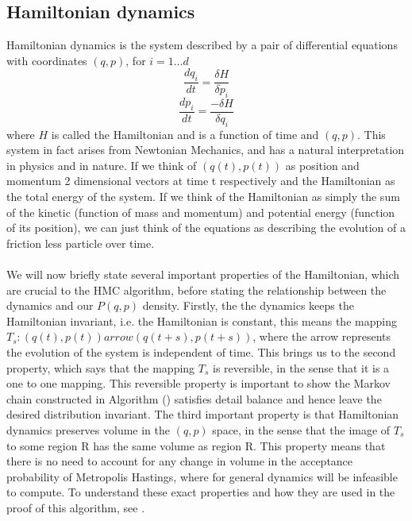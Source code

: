\documentclass[11pt]{article}
\begin{document}
\subsection{Hamiltonian dynamics}
Hamiltonian dynamics is the system described by a pair of differential equations with coordinates $(q,p)$, for $i=1 \dots d$
\begin{equation}
\frac{dq_{i}}{dt} = \frac{\delta H}{\delta p_{i}}
\end{equation}
\begin{equation}
\frac{dp_{i}}{dt} = \frac{-\delta H}{\delta q_{i}}
\end{equation}
where $H$ is called the Hamiltonian and is a function of time and $(q,p)$. This system in fact arises from Newtonian Mechanics, and has a natural interpretation in physics and in nature. If we think of $(q(t),p(t))$ as position and momentum 2 dimensional vectors at time t respectively and the Hamiltonian as the total energy of the system. If we think of the Hamiltonian as simply the sum of the kinetic (function of mass and momentum) and potential energy (function of its position), we can just think of the equations as describing the evolution of a friction less particle over time.\\ \\
We will now briefly state several important properties of the Hamiltonian, which are crucial to the HMC algorithm, before stating the relationship between the dynamics and our $P(q,p)$ density. Firstly, the the dynamics keeps the Hamiltonian invariant, i.e. the Hamiltonian is constant, this means the mapping $T_s: (q(t),p(t)) arrow (q(t+s),p(t+s))$, where the arrow represents the evolution of the system is independent of time. This brings us to the second property, which says that the mapping $T_s$ is reversible, in the sense that it is a one to one mapping. This reversible property is important to show the Markov chain constructed in Algorithm () satisfies detail balance and hence leave the desired distribution invariant. The third important property is that Hamiltonian dynamics preserves volume in the $(q,p)$ space, in the sense that the image of $T_s$ to some region R has the same volume as region R. This property means that there is no need to account for any change in volume in the acceptance probability of Metropolis Hastings, where for general dynamics will be infeasible to compute. To understand these exact properties and how they are used in the proof of this algorithm, see .
\end{document}
